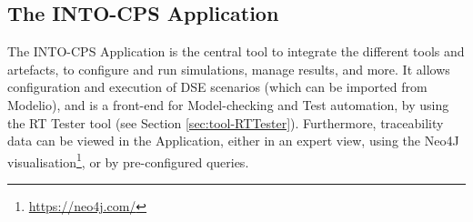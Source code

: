 \subsection{The INTO-CPS Application}

The INTO-CPS Application is the central tool to integrate the different tools and artefacts, to configure and run simulations, manage results, and more. It allows configuration and execution of DSE scenarios (which can be imported from Modelio), and is a front-end for Model-checking and Test automation, by using the RT Tester tool (see Section \ref{sec:tool-RTTester}). Furthermore, traceability data can be viewed in the Application, either in an expert view, using the Neo4J visualisation\footnote{\url{https://neo4j.com/}}, or by pre-configured queries.

